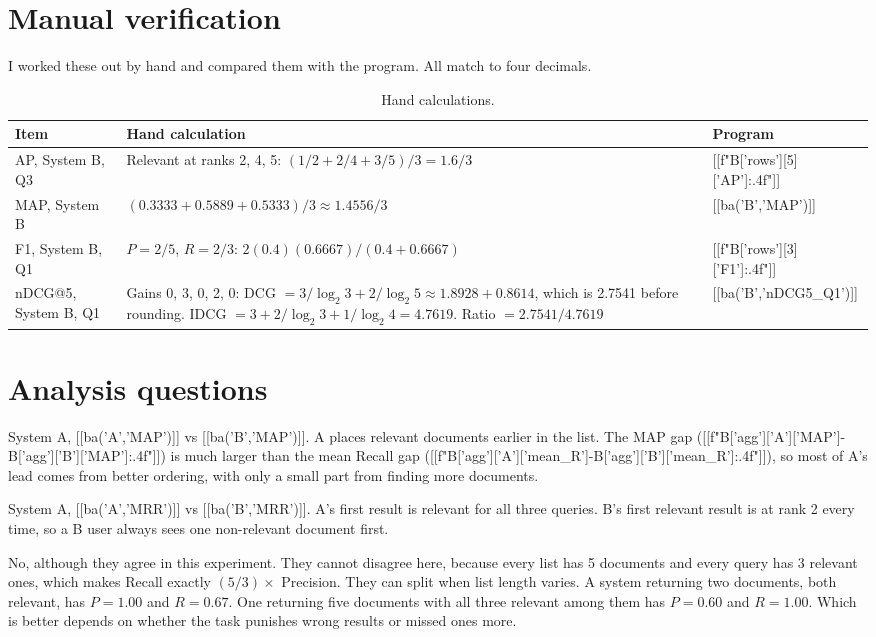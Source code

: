 \section{Manual verification}
I worked these out by hand and compared them with the program. All match to four decimals.
\begin{table}[H]\small\centering\caption{Hand calculations.}
\renewcommand{\arraystretch}{1.3}
\begin{tabularx}{\linewidth}{@{}lYl@{}}\toprule
Item & Hand calculation & Program \\\midrule
AP, System B, Q3 & Relevant at ranks 2, 4, 5: $(1/2+2/4+3/5)/3=1.6/3$ & [[f"{B['rows'][5]['AP']:.4f}"]] \\
MAP, System B & $(0.3333+0.5889+0.5333)/3\approx 1.4556/3$ & [[ba('B','MAP')]] \\
F1, System B, Q1 & $P=2/5$, $R=2/3$: $2(0.4)(0.6667)/(0.4+0.6667)$ & [[f"{B['rows'][3]['F1']:.4f}"]] \\
nDCG@5, System B, Q1 & Gains 0, 3, 0, 2, 0: DCG $=3/\log_2 3+2/\log_2 5\approx 1.8928+0.8614$, which is 2.7541 before rounding. IDCG $=3+2/\log_2 3+1/\log_2 4=4.7619$. Ratio $=2.7541/4.7619$ & [[ba('B','nDCG5_Q1')]] \\
\bottomrule\end{tabularx}\end{table}

\section{Analysis questions}
System A, [[ba('A','MAP')]] vs [[ba('B','MAP')]]. A places relevant documents earlier in the list. The MAP gap ([[f"{B['agg']['A']['MAP']-B['agg']['B']['MAP']:.4f}"]]) is much larger than the mean Recall gap ([[f"{B['agg']['A']['mean_R']-B['agg']['B']['mean_R']:.4f}"]]), so most of A's lead comes from better ordering, with only a small part from finding more documents.

System A, [[ba('A','MRR')]] vs [[ba('B','MRR')]]. A's first result is relevant for all three queries. B's first relevant result is at rank 2 every time, so a B user always sees one non-relevant document first.

No, although they agree in this experiment. They cannot disagree here, because every list has 5 documents and every query has 3 relevant ones, which makes Recall exactly $(5/3)\times$ Precision. They can split when list length varies. A system returning two documents, both relevant, has $P=1.00$ and $R=0.67$. One returning five documents with all three relevant among them has $P=0.60$ and $R=1.00$. Which is better depends on whether the task punishes wrong results or missed ones more.


